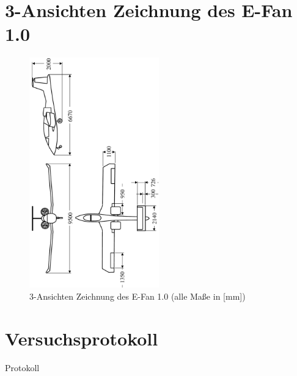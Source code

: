 \documentclass[utf8, a4paper, 11pt, parskip, pointlessnumbers]{scrreprt}
\begin{document}
\section{3-Ansichten Zeichnung des E-Fan 1.0}
\begin{figure}[H]
	\centering
	\includegraphics[trim = 0mm 0mm 0mm 0mm, clip,width=0.5\textwidth]{Anhang/3views_EFan}
	\caption[]{3-Ansichten Zeichnung des E-Fan 1.0 (alle Maße in [$\si{\milli\metre}$])}
	\label{fig:3views}
\end{figure}

\section{Versuchsprotokoll}
Protokoll

\resumetocwriting %
\end{document}
